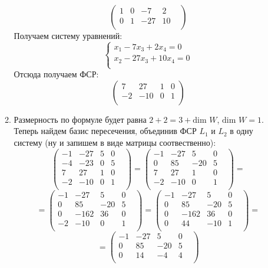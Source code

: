 \documentclass[a4paper,12pt]{article}
\begin{document}
\begin{itemize}
\begin{enumerate}
\[\begin{pmatrix}
1 & 0 & -7 & 2 & \\
0 & 1 & -27 & 10 & \\
\end{pmatrix}
\]
Получаем систему уравнений:
\[
\begin{cases}
x_1 - 7x_3 + 2x_4 = 0 \\
x_2 - 27x_3 + 10x_4 = 0\\
\end{cases}
\]
Отсюда получаем ФСР:
\[
\begin{pmatrix}
7 & 27 & 1 & 0 \\
-2 & -10 & 0 & 1 \\
\end{pmatrix}
\]
\item
Размерность по формуле будет равна $2 + 2 = 3 + \text{dim } W$, $\text{dim } W  = 1$.  Теперь найдем базис пересечения, объединив ФСР $L_1$ и $L_2$ в одну систему (ну и запишем в виде матрицы соотвественно):
\[
\begin{pmatrix}
-1 & -27 & 5 & 0 & \\
-4 & -23 & 0 & 5 & \\
7 & 27 & 1 & 0 & \\
-2 & -10 & 0 & 1 & \\
\end{pmatrix}
=
\begin{pmatrix}
-1 & -27 & 5 & 0 & \\
0 & 85 & -20 & 5 & \\
7 & 27 & 1 & 0 & \\
-2 & -10 & 0 & 1 & \\
\end{pmatrix}
=
\]
\[
=
\begin{pmatrix}
-1 & -27 & 5 & 0 & \\
0 & 85 & -20 & 5 & \\
0 & -162 & 36 & 0 & \\
-2 & -10 & 0 & 1 & \\
\end{pmatrix}
=
\begin{pmatrix}
-1 & -27 & 5 & 0 & \\
0 & 85 & -20 & 5 & \\
0 & -162 & 36 & 0 & \\
0 & 44 & -10 & 1 & \\
\end{pmatrix}
=
\]
\[
=
\begin{pmatrix}
-1 & -27 & 5 & 0 & \\
0 & 85 & -20 & 5 & \\
0 & 14 & -4 & 4 & \\

\end{pmatrix}\]
\end{enumerate}
\end{itemize}
\end{document}
